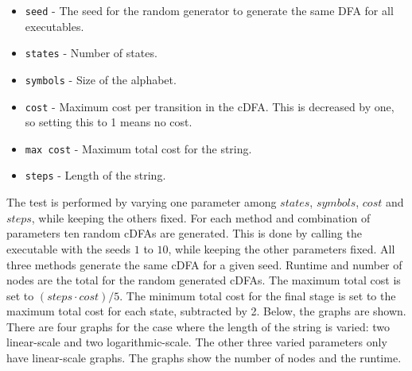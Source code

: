 \documentclass[a4paper,11pt]{article}
\begin{document}
\begin{itemize}
\item{\texttt{seed}} - The seed for the random generator to generate the same DFA for all executables.
\item{\texttt{states}} - Number of states.
\item{\texttt{symbols}} - Size of the alphabet.
\item{\texttt{cost}} - Maximum cost per transition in the cDFA. This is decreased by one, so setting this to 1 means no cost.
\item{\texttt{max cost}} - Maximum total cost for the string.
\item{\texttt{steps}} - Length of the string.
\end{itemize}
The test is performed by varying one parameter among $\mathit{states}$, $\mathit{symbols}$, $\mathit{cost}$ and $\mathit{steps}$, while keeping the others fixed. For each method and combination of parameters ten random cDFAs are generated. This is done by calling the executable with the seeds $1$ to $10$, while keeping the other parameters fixed. All three methods generate the same cDFA for a given seed. Runtime and number of nodes are the total for the random generated cDFAs. The maximum total cost is set to $(\mathit{steps}\cdot \mathit{cost})/5$. The minimum total cost for the final stage is set to the maximum total cost for each state, subtracted by 2. Below, the graphs are shown. There are four graphs for the case where the length of the string is varied: two linear-scale and two logarithmic-scale. The other three varied parameters only have linear-scale graphs. The graphs show the number of nodes and the runtime.






%
\end{document}

